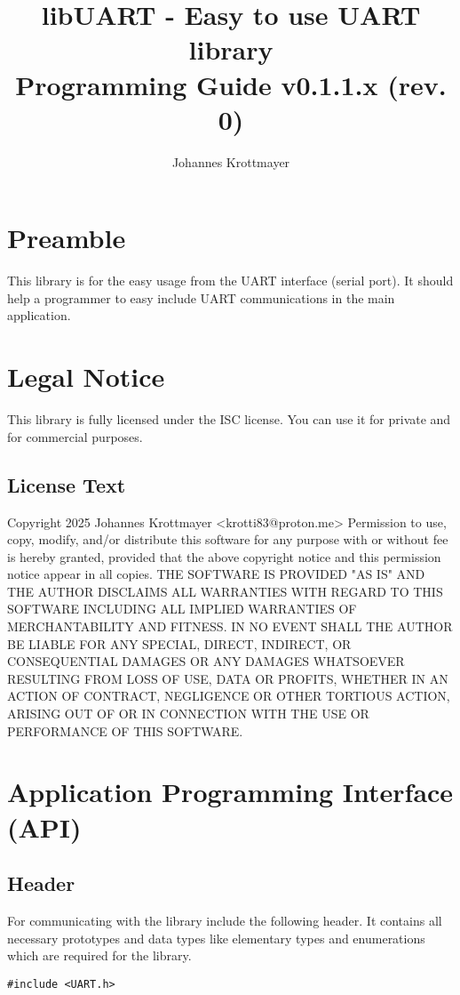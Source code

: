 \documentclass{report}
\title{libUART - Easy to use UART library \\ Programming Guide v0.1.1.x (rev. 0)}
\author{Johannes Krottmayer}
\begin{document}
\maketitle
\tableofcontents
\chapter{Preamble}
This library is for the easy usage from the UART interface (serial port). It should help
a programmer to easy include UART communications in the main application.
\chapter{Legal Notice}
This library is fully licensed under the ISC license. You can use it for private and
for commercial purposes.
\section{License Text}
Copyright 2025 Johannes Krottmayer <krotti83@proton.me>\newline
\newline
Permission to use, copy, modify, and/or distribute this software for any
purpose with or without fee is hereby granted, provided that the above
copyright notice and this permission notice appear in all copies.\newline
\newline
THE SOFTWARE IS PROVIDED "AS IS" AND THE AUTHOR DISCLAIMS ALL WARRANTIES
WITH REGARD TO THIS SOFTWARE INCLUDING ALL IMPLIED WARRANTIES OF
MERCHANTABILITY AND FITNESS. IN NO EVENT SHALL THE AUTHOR BE LIABLE FOR
ANY SPECIAL, DIRECT, INDIRECT, OR CONSEQUENTIAL DAMAGES OR ANY DAMAGES
WHATSOEVER RESULTING FROM LOSS OF USE, DATA OR PROFITS, WHETHER IN AN
ACTION OF CONTRACT, NEGLIGENCE OR OTHER TORTIOUS ACTION, ARISING OUT OF
OR IN CONNECTION WITH THE USE OR PERFORMANCE OF THIS SOFTWARE.
\chapter{Application Programming Interface (API)}
\section{Header}
For communicating with the library include the following header. It
contains all necessary prototypes and data types like elementary types
and enumerations which are required for the library.
\begin{lstlisting}
#include <UART.h>
\end{lstlisting}
\end{document}
